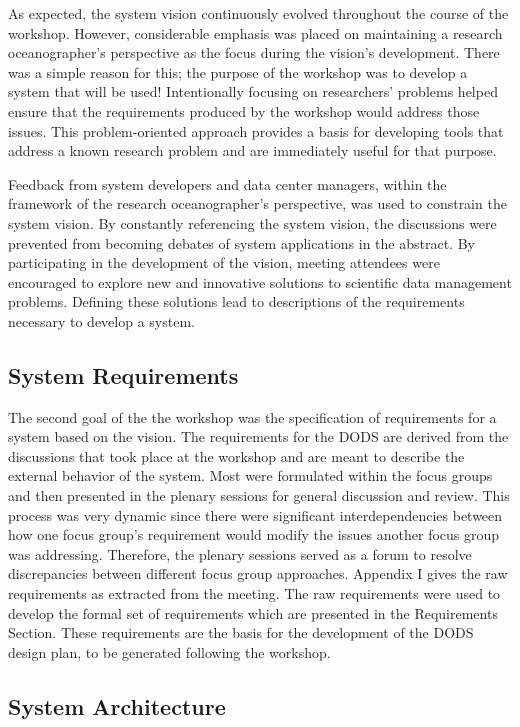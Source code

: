 As expected, the system vision continuously evolved throughout the course of
the workshop. However, considerable emphasis was placed on maintaining a
research oceanographer's perspective as the focus during the vision's
development. There was a simple reason for this; the purpose of the workshop
was to develop a system that will be used! Intentionally focusing on
researchers' problems helped ensure that the requirements produced by the
workshop would address those issues. This problem-oriented approach provides
a basis for developing tools that address a known research problem and are
immediately useful for that purpose.

Feedback from system developers and data center managers, within the
framework of the research oceanographer's perspective, was used to constrain
the system vision. By constantly referencing the system vision, the
discussions were prevented from becoming debates of system applications in
the abstract. By participating in the development of the vision, meeting
attendees were encouraged to explore new and innovative solutions to
scientific data management problems. Defining these solutions lead to
descriptions of the requirements necessary to develop a system.

\subsection {System Requirements}

The second goal of the the workshop was the specification of requirements for
a system based on the vision. The requirements for the DODS are derived from
the discussions that took place at the workshop and are meant to describe the
external behavior of the system. Most were formulated within the focus groups
and then presented in the plenary sessions for general discussion and
review. This process was very dynamic since there were significant
interdependencies between how one focus group's requirement would modify the
issues another focus group was addressing. Therefore, the plenary sessions
served as a forum to resolve discrepancies between different focus group
approaches. Appendix I gives the raw requirements as extracted from the
meeting. The raw requirements were used to develop the formal set of
requirements which are presented in the Requirements Section. These
requirements are the basis for the development of the DODS design plan, to be
generated following the workshop.

\subsection {System Architecture}

